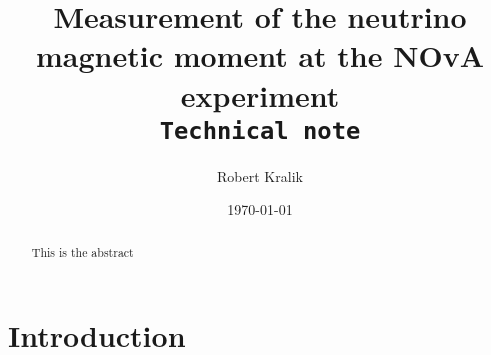 \documentclass[12pt]{article}
\title{Measurement of the neutrino magnetic moment at the NOvA experiment\\ \vspace*{1cm} \texttt{Technical note}}
\author[1]{Robert Kralik}
\affil[1]{University of Sussex, Brighton, UK}
\date{\today}
\begin{document}
\maketitle

\begin{abstract}
    This is the abstract
\end{abstract}

\section{Introduction}



\end{document}
